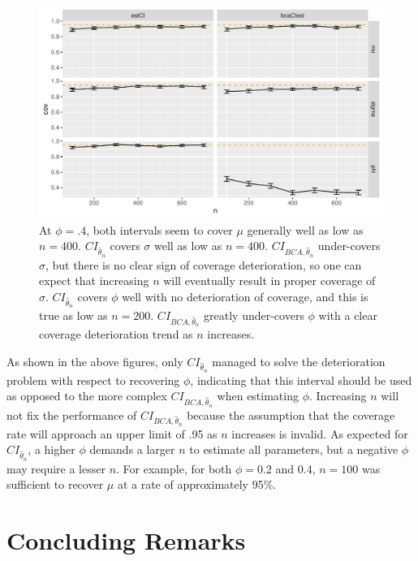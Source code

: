 \documentclass[12pt, letterpaper, titlepage]{article}
\begin{document}
\begin{figure}[tbp]
  \centering
  \includegraphics[width=\textwidth]{figures/plot_.4}
  \caption{At $\phi = .4$, both intervals seem to cover $\mu$ generally well
    as low as $n = 400$. $CI_{\hat{\theta}_{n}}$ covers $\sigma$ well as low
    as $n = 400$. $CI_{BCA, \hat{\theta}_{n}}$ under-covers $\sigma$, but
    there is no clear sign of coverage deterioration, so one can expect that
    increasing $n$ will eventually result in proper coverage of $\sigma$.
    $CI_{\hat{\theta}_{n}}$ covers $\phi$ well with no deterioration of
    coverage, and this is true as low as $n = 200$.
    $CI_{BCA, \hat{\theta}_{n}}$ greatly under-covers $\phi$ with a clear
    coverage deterioration trend as $n$ increases.}
  \label{fig:plot_.4}
\end{figure}


As shown in the above figures, only $CI_{\hat{\theta}_{n}}$ managed to solve
the deterioration problem with respect to recovering $\phi$, indicating that
this interval should be used as opposed to the more complex
$CI_{BCA, \hat{\theta}_{n}}$ when estimating $\phi$. Increasing $n$ will not
fix the performance of $CI_{BCA, \hat{\theta}_{n}}$ because the assumption that
the coverage rate will approach an upper limit of .95 as $n$ increases is
invalid. As expected for $CI_{\hat{\theta}_{n}}$, a higher $\phi$ demands a
larger $n$ to estimate all parameters, but a negative $\phi$ may require a
lesser $n$. For example, for both $\phi = 0.2$ and $0.4$, $n = 100$ was
sufficient to recover $\mu$ at a rate of approximately 95\%.


\section{Concluding Remarks}
\label{sec:conremarks}
\end{document}
